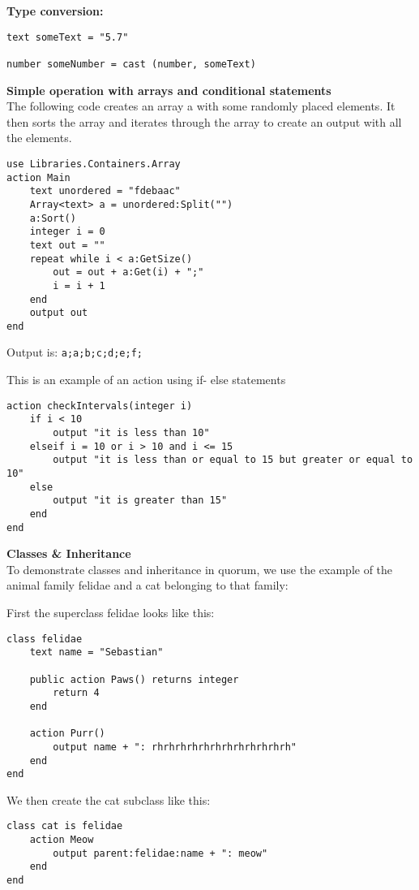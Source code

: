 \textbf{Type conversion:}\\
\begin{lstlisting}[language=Quorum]
text someText = "5.7"

number someNumber = cast (number, someText)
\end{lstlisting}

\textbf{Simple operation with arrays and conditional statements}\\
The following code creates an array a with some randomly placed elements. It then sorts the array and iterates through the array to create an output with all the elements.

\begin{lstlisting}[language=Quorum]
use Libraries.Containers.Array
action Main
	text unordered = "fdebaac"
	Array<text> a = unordered:Split("")
	a:Sort()
	integer i = 0
	text out = ""
	repeat while i < a:GetSize()
		out = out + a:Get(i) + ";"
		i = i + 1
	end
	output out
end
\end{lstlisting}

Output is:
\lstinline!a;a;b;c;d;e;f;!

This is an example of an action using if- else statements

\begin{lstlisting}[language=Quorum]
action checkIntervals(integer i)
    if i < 10
        output "it is less than 10"
    elseif i = 10 or i > 10 and i <= 15
        output "it is less than or equal to 15 but greater or equal to 10"
    else
        output "it is greater than 15"
    end
end
\end{lstlisting}

\textbf{Classes \& Inheritance}\\
To demonstrate classes and inheritance in quorum, we use the example of the animal family felidae and a cat belonging to that family:

First the superclass felidae looks like this:

\begin{lstlisting}[language=Quorum]
class felidae 
    text name = "Sebastian"

    public action Paws() returns integer
        return 4
    end

    action Purr()
        output name + ": rhrhrhrhrhrhrhrhrhrhrhrh"
    end
end
\end{lstlisting}

We then create the cat subclass like this:

\begin{lstlisting}[language=Quorum]
class cat is felidae
    action Meow
        output parent:felidae:name + ": meow"
    end
end
\end{lstlisting}

